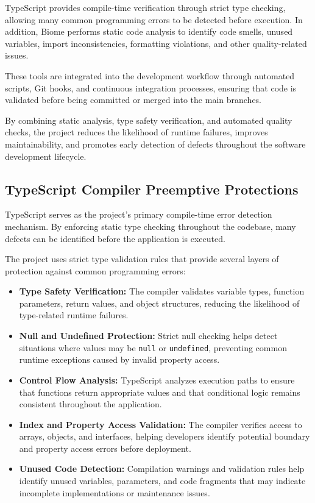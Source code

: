 \documentclass[letterpaper%
, oneside%
, 12pt%
, memoireprojet%
, english%
,creativecommons,hyperref, withAlgo2e %
]{thETS}
\begin{document}
TypeScript provides compile-time verification through strict type checking, allowing many common programming errors to be detected before execution. In addition, Biome performs static code analysis to identify code smells, unused variables, import inconsistencies, formatting violations, and other quality-related issues.

These tools are integrated into the development workflow through automated scripts, Git hooks, and continuous integration processes, ensuring that code is validated before being committed or merged into the main branches.

By combining static analysis, type safety verification, and automated quality checks, the project reduces the likelihood of runtime failures, improves maintainability, and promotes early detection of defects throughout the software development lifecycle.


\subsection{TypeScript Compiler Preemptive Protections}

TypeScript serves as the project's primary compile-time error detection mechanism. By enforcing static type checking throughout the codebase, many defects can be identified before the application is executed.

The project uses strict type validation rules that provide several layers of protection against common programming errors:

\begin{itemize}

\item \textbf{Type Safety Verification:}
The compiler validates variable types, function parameters, return values, and object structures, reducing the likelihood of type-related runtime failures.

\item \textbf{Null and Undefined Protection:}
Strict null checking helps detect situations where values may be \texttt{null} or \texttt{undefined}, preventing common runtime exceptions caused by invalid property access.

\item \textbf{Control Flow Analysis:}
TypeScript analyzes execution paths to ensure that functions return appropriate values and that conditional logic remains consistent throughout the application.

\item \textbf{Index and Property Access Validation:}
The compiler verifies access to arrays, objects, and interfaces, helping developers identify potential boundary and property access errors before deployment.

\item \textbf{Unused Code Detection:}
Compilation warnings and validation rules help identify unused variables, parameters, and code fragments that may indicate incomplete implementations or maintenance issues.

\end{itemize}
\end{document}

